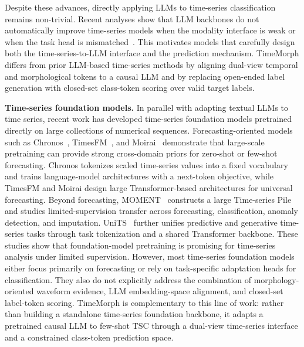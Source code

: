 \documentclass[10pt,journal,compsoc]{IEEEtran}
\begin{document}
Despite these advances, directly applying LLMs to time-series classification remains non-trivial. Recent analyses show that LLM backbones do not automatically improve time-series models when the modality interface is weak or when the task head is mismatched~\cite{tan2024language,merrill2024struggle}. This motivates models that carefully design both the time-series-to-LLM interface and the prediction mechanism. TimeMorph differs from prior LLM-based time-series methods by aligning dual-view temporal and morphological tokens to a causal LLM and by replacing open-ended label generation with closed-set class-token scoring over valid target labels.

\noindent\textbf{Time-series foundation models.}
In parallel with adapting textual LLMs to time series, recent work has developed time-series foundation models pretrained directly on large collections of numerical sequences. Forecasting-oriented models such as Chronos~\cite{ansari2024chronos}, TimesFM~\cite{das2024timesfm}, and Moirai~\cite{woo2024moirai} demonstrate that large-scale pretraining can provide strong cross-domain priors for zero-shot or few-shot forecasting. Chronos tokenizes scaled time-series values into a fixed vocabulary and trains language-model architectures with a next-token objective, while TimesFM and Moirai design large Transformer-based architectures for universal forecasting. Beyond forecasting, MOMENT~\cite{goswami2024moment} constructs a large Time-series Pile and studies limited-supervision transfer across forecasting, classification, anomaly detection, and imputation. UniTS~\cite{gao2024units} further unifies predictive and generative time-series tasks through task tokenization and a shared Transformer backbone. These studies show that foundation-model pretraining is promising for time-series analysis under limited supervision. However, most time-series foundation models either focus primarily on forecasting or rely on task-specific adaptation heads for classification. They also do not explicitly address the combination of morphology-oriented waveform evidence, LLM embedding-space alignment, and closed-set label-token scoring. TimeMorph is complementary to this line of work: rather than building a standalone time-series foundation backbone, it adapts a pretrained causal LLM to few-shot TSC through a dual-view time-series interface and a constrained class-token prediction space.
\end{document}
